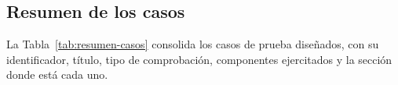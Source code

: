 \newcommand{\FichaCaso}[9]{%
  \def\FichaId{#1}%
  \def\FichaAutor{#2}%
  \def\FichaFechaCreacion{#3}%
  \def\FichaTitulo{#4}%
  \def\FichaEjecutor{#5}%
  \def\FichaFechaEjecucion{#6}%
  \def\FichaDescripcion{#7}%
  \def\FichaTipo{#8}%
  \def\FichaPrecondiciones{#9}%
  \FichaCasoAux
}

\newenvironment{TablaPasos}[1]{%
\small
\renewcommand{\arraystretch}{1.2}
\setlength{\tabcolsep}{2.5pt}
\begin{xltabular}{\textwidth}{|>{\centering\arraybackslash}p{0.7cm}|>{\raggedright\arraybackslash}X|>{\raggedright\arraybackslash}X|>{\raggedright\arraybackslash}X|>{\raggedright\arraybackslash}p{1.6cm}|>{\centering\arraybackslash}p{1.2cm}|>{\raggedright\arraybackslash}p{1.4cm}|}
\caption{#1}\\
\hline
\textbf{Paso} & \textbf{Acciones} & \textbf{Datos} & \textbf{Resultado esperado} & \textbf{Resultado obtenido} & \textbf{Estado} & \textbf{Notas} \\ \hline
\endfirsthead
\multicolumn{7}{c}{\tablename~\thetable{} -- continuación}\\
\hline
\textbf{Paso} & \textbf{Acciones} & \textbf{Datos} & \textbf{Resultado esperado} & \textbf{Resultado obtenido} & \textbf{Estado} & \textbf{Notas} \\ \hline
\endhead
\hline
\multicolumn{7}{r}{Continúa en la página siguiente}\\
\endfoot
\hline
\endlastfoot
}{%
}

\subsection{Resumen de los casos}

La Tabla~\ref{tab:resumen-casos} consolida los casos de prueba diseñados, con su identificador, título, tipo de comprobación, componentes ejercitados y la sección donde está cada uno.

